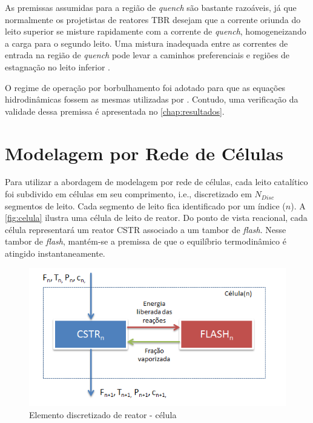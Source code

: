 As premissas assumidas para a região de \emph{quench} são bastante razoáveis, já
que normalmente os projetistas de reatores TBR desejam que a corrente oriunda do
leito superior se misture rapidamente com a corrente de \emph{quench},
homogeneizando a carga para o segundo leito. Uma mistura inadequada entre as
correntes de entrada na região de \emph{quench} pode levar a caminhos
preferenciais e regiões de estagnação no leito inferior \cite{Ancheyta2011}.

O regime de operação por borbulhamento foi adotado para que as
equações hidrodinâmicas fossem as mesmas utilizadas por .
Contudo, uma verificação da validade dessa premissa é apresentada no
\autoref{chap:resultados}.

\section{Modelagem por Rede de Células} \label{sec:modelagemredecelulas}

Para utilizar a abordagem de modelagem por rede de células, cada leito
catalítico foi subdivido em células em seu comprimento, i.e., discretizado em
$N_{Disc}$ segmentos de leito. Cada segmento de leito fica identificado por
um índice ($n$). A \autoref{fig:celula} ilustra uma célula de leito de
reator. Do ponto de vista reacional, cada célula representará um reator CSTR
associado a um tambor de \emph{flash}. Nesse tambor de \emph{flash}, mantém-se a
premissa de que o equilíbrio termodinâmico é atingido instantaneamente.

 \begin{figure}[htb]
 \centering \includegraphics[scale=0.75]{images/Chap3/celula.png}
 \caption{Elemento discretizado de reator - célula}
 \label{fig:celula}
 \end{figure}

